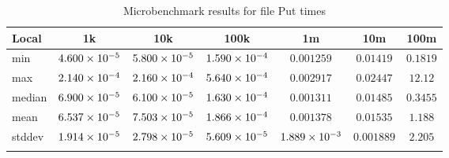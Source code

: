 \begin{table}
{\begin{tabular}[h]{l|c|c|c|c|c|c}
Local & 1k & 10k & 100k & 1m & 10m & 100m \\
\hline
min & $4.600\times 10^{-5}$ & $5.800\times 10^{-5}$ & $1.590\times 10^{-4}$ & $0.001259$ & $0.01419$ & $0.1819$ \\
max & $2.140\times 10^{-4}$ & $2.160\times 10^{-4}$ & $5.640\times 10^{-4}$ & $0.002917$ & $0.02447$ & $12.12$ \\
median & $6.900\times 10^{-5}$ & $6.100\times 10^{-5}$ & $1.630\times 10^{-4}$ & $0.001311$ & $0.01485$ & $0.3455$ \\
mean & $6.537\times 10^{-5}$ & $7.503\times 10^{-5}$ & $1.866\times 10^{-4}$ & $0.001378$ & $0.01535$ & $1.188$ \\
stddev & $1.914\times 10^{-5}$ & $2.798\times 10^{-5}$ & $5.609\times 10^{-5}$ & $1.889\times 10^{-3}$ & $0.001889$ & $2.205$ \\
\\
\end{tabular}
}
\caption{Microbenchmark results for file Put times}
\end{table}



